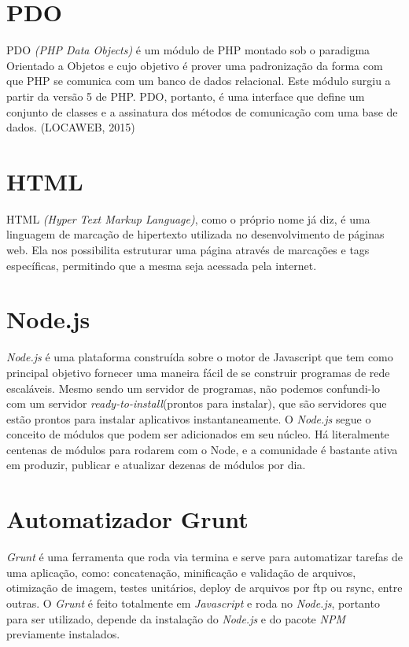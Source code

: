     \section{PDO\label{sec:pdo}}
        PDO \emph{(PHP Data Objects)} é um módulo de PHP montado sob o paradigma Orientado a Objetos e cujo objetivo é prover uma padronização da forma com que PHP se comunica com um banco de dados relacional. Este módulo surgiu a partir da versão 5 de PHP. PDO, portanto, é uma interface que define um conjunto de classes e a assinatura dos métodos de comunicação com uma base de dados. (LOCAWEB, 2015)

    \section{HTML\label{sec:hmtl}}
        HTML \emph{(Hyper Text Markup Language)}, como o próprio nome já diz, é uma linguagem de marcação de hipertexto utilizada no desenvolvimento de páginas web. Ela nos possibilita estruturar uma página através de marcações e tags específicas, permitindo que a mesma seja acessada pela internet.

    \section{Node.js\label{sec:node-js}}
        \emph{Node.js} é uma plataforma construída sobre o motor de Javascript que tem como principal objetivo fornecer uma maneira fácil de se construir programas de rede escaláveis. Mesmo sendo um servidor de programas, não podemos confundi-lo com um servidor \emph{ready-to-install}(prontos para instalar), que são servidores que estão prontos para instalar aplicativos instantaneamente. O \emph{Node.js} segue o conceito de módulos que podem ser adicionados em seu núcleo. Há literalmente centenas de módulos para rodarem com o Node, e a comunidade é bastante ativa em produzir, publicar e atualizar dezenas de módulos por dia.

    \section{Automatizador Grunt\label{sec:automatizador-grunt}}
        \emph{Grunt} é uma ferramenta que roda via termina e serve para automatizar tarefas de uma aplicação, como: concatenação, minificação e validação de arquivos, otimização de imagem, testes unitários, deploy de arquivos por ftp ou rsync, entre outras. O \emph{Grunt} é feito totalmente em \emph{Javascript} e roda no \emph{Node.js}, portanto para ser utilizado, depende da instalação do \emph{Node.js} e do pacote \emph{NPM} previamente instalados.

